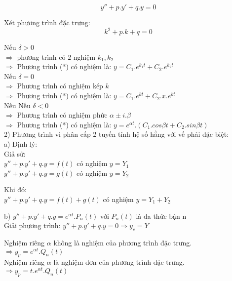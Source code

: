     \begin{equation*}
        y'' + p.y' + q.y = 0
    \end{equation*}

    Xét phương trình đặc trưng:
    \begin{equation*}
        k^2 + p.k + q = 0
    \end{equation*}

    Nếu $\delta > 0$ \\
    $\Rightarrow$ phương trình có 2 nghiệm $k_1, k_2$ \\
    $\Rightarrow$ Phương trình (*) có nghiệm là: $y= C_1.e^{k_1 t}+C_2.e^{k_2 t}$ \\

    Nếu $\delta = 0$ \\
    $\Rightarrow$ Phương trình có nghiệm kép $k$ \\
    $\Rightarrow$ Phương trình (*) có nghiệm là: $y = C_1.e^{kt}+C_2.x.e^{kt}$ \\

    Nếu Nếu $\delta < 0$ \\
    $\Rightarrow$ Phương trình có nghiệm phức $\alpha \pm i.\beta$ \\
    $\Rightarrow$ Phương trình (*) có nghiệm là: $y = e^{\alpha t}.(C_1.cos{\beta t} + C_2.sin{\beta t})$ \\

    2) Phương trình vi phân cấp 2 tuyến tính hệ số hằng với vế phải đặc biệt: \\
    a)    Định lý: \\

    Giả sử: \\
    $ y''+p.y'+q.y=f(t)$
    có nghiệm $y=Y_1$ \\
    $y''+p.y'+q.y=g(t)$
    có nghiệm $y=Y_2$

    Khi đó: \\
    $y''+p.y'+q.y=f(t)+g(t)$
    có nghiệm $y=Y_1+Y_2$

    b) $y''+p.y'+q.y=e^{\alpha t}.P_n (t)$ với $P_n(t)$ là đa thức bận n\\

    Giải phương trình: $y''+p.y'+q.y=0 \Rightarrow y_c=Y$

    Nghiệm riêng $\alpha$ không là nghiệm của phương trình đặc trưng. \\
    $\Rightarrow y_p=e^{\alpha t}.Q_n (t)$ \\

    Nghiệm riêng $\alpha$ là nghiệm đơn của phương trình đặc trưng. \\
    $\Rightarrow y_p=t.e^{\alpha t}.Q_n (t)$ \\

